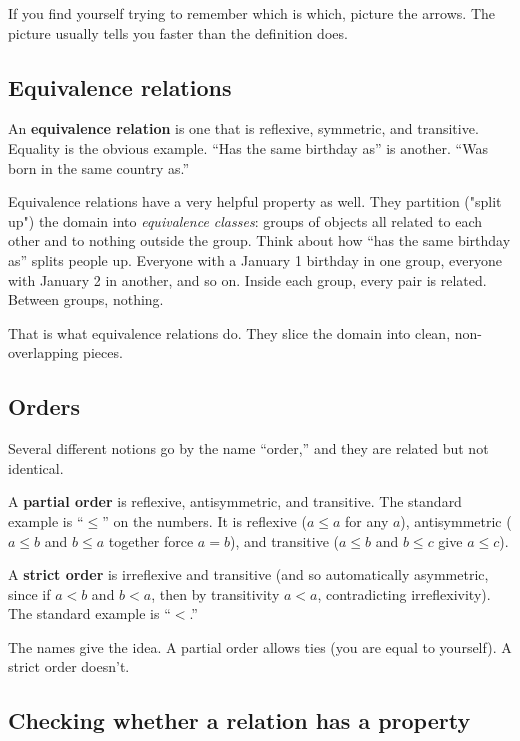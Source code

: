 \documentclass[11pt]{article}
\begin{document}
If you find yourself trying to remember which is which, picture the arrows. The picture usually tells you faster than the definition does.

\subsection{Equivalence relations}

An \textbf{equivalence relation} is one that is reflexive, symmetric, and transitive. Equality is the obvious example. ``Has the same birthday as'' is another. ``Was born in the same country as.''

Equivalence relations have a very helpful property as well. They partition ("split up") the domain into \emph{equivalence classes}: groups of objects all related to each other and to nothing outside the group. Think about how ``has the same birthday as'' splits people up. Everyone with a January 1 birthday in one group, everyone with January 2 in another, and so on. Inside each group, every pair is related. Between groups, nothing.

That is what equivalence relations do. They slice the domain into clean, non-overlapping pieces.

\subsection{Orders}

Several different notions go by the name ``order,'' and they are related but not identical.

A \textbf{partial order} is reflexive, antisymmetric, and transitive. The standard example is ``$\leq$'' on the numbers. It is reflexive ($a \leq a$ for any $a$), antisymmetric ($a \leq b$ and $b \leq a$ together force $a = b$), and transitive ($a \leq b$ and $b \leq c$ give $a \leq c$).

A \textbf{strict order} is irreflexive and transitive (and so automatically asymmetric, since if $a < b$ and $b < a$, then by transitivity $a < a$, contradicting irreflexivity). The standard example is ``$<$.''

The names give the idea. A partial order allows ties (you are equal to yourself). A strict order doesn't.

\subsection{Checking whether a relation has a property}
\end{document}
